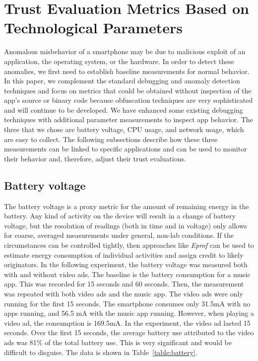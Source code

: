 \section{Trust Evaluation Metrics Based on Technological Parameters}

Anomalous misbehavior of a smartphone may be due to malicious exploit 
of an application, the operating system, or the hardware. In order to 
detect these anomalies, we first need to establish baseline 
measurements for normal behavior. In this paper, we complement the 
standard debugging and anomaly detection techniques and focus on 
metrics that could be obtained without inspection of the app’s source 
or binary code because obfuscation techniques are very sophisticated 
and will continue to be developed.
We have enhanced some existing debugging techniques with additional parameter measurements to inspect app behavior.
The three that we chose are battery voltage, CPU usage, and network usage, which are easy to collect.
The following subsections describe how these three measurements can be linked to specific applications
and can be used to monitor their behavior and, therefore, adjust their trust evaluations.


\subsection{Battery voltage}
The battery voltage is a proxy metric for the amount of remaining 
energy in the battery. Any kind of activity on the device will result 
in a change of battery voltage, but the resolution of readings (both 
in time and in voltage) only allows for coarse, averaged measurements 
under general, non-lab conditions.
If the circumstances can be controlled tightly, then approaches like 
\textit{Eprof} \cite{pathak2012fine} can be used to estimate energy consumption 
of individual activities and assign credit to likely originators.  In the following experiment,
the battery voltage was measured both with and without video ads.
The ​baseline is the battery consumption for a music app.
This was recorded for 15 seconds and 60 seconds.  Then, the measurement was repeated
with both video ads and the music app.  The video ads were only running for the first 15 seconds.
The smartphone consumes only 31.5mA with no apps running, and 56.5 mA with the music app
running.
However, when playing a video ad, the consumption is 169.5mA. 
In the experiment, the video ad lasted 15 seconds.
Over the first 15 seconds, the average battery use attributed to the video ads was 81\% of the total
battery use.  This is very significant and would be difficult to disguise.
The data is shown in Table~\ref{table:battery}.



